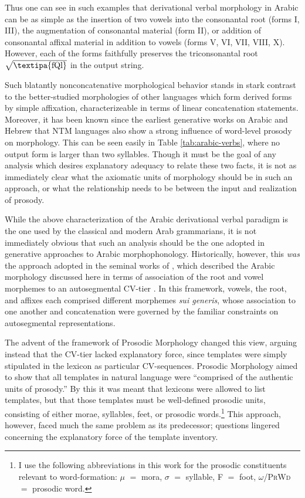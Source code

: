\documentclass[12pt,twoside,letterpaper]{article}
\begin{document}
Thus one can see in such examples that derivational verbal morphology in Arabic can be as simple as the insertion of two vowels into the consonantal root (forms I, III), the augmentation of consonantal material (form II), or addition of consonantal affixal material in addition to vowels (forms V, VI, VII, VIII, X). However, each of the forms faithfully preserves the triconsonantal root $\sqrt{\textrm{\textipa{fQl}}}$ in the output string.

Such blatantly nonconcatenative morphological behavior stands in stark contrast to the better-studied morphologies of other languages which form derived forms by simple affixation, characterizeable in terms of linear concatenation statements. Moreover, it has been known since the earliest generative works on Arabic and Hebrew \citep{mccarthy79,mccarthy81} that NTM languages also show a strong influence of word-level prosody on morphology. This can be seen easily in Table \ref{tab:arabic-verbs}, where no output form is larger than two syllables. Though it must be the goal of any analysis which desires explanatory adequacy to relate these two facts, it is not as immediately clear what the axiomatic units of morphology should be in such an approach, or what the relationship needs to be between the input and realization of prosody.

While the above characterization of the Arabic derivational verbal paradigm is the one used by the classical and modern Arab grammarians, it is not immediately obvious that such an analysis should be the one adopted in generative approaches to Arabic morphophonology. Historically, however, this \emph{was} the approach adopted in the seminal works of \cite{mccarthy79,mccarthy81,mccarthy85}, which described the Arabic morphology discussed here in terms of association of the root and vowel morphemes to an autosegmental CV-tier \citep{goldsmith76}. In this framework, vowels, the root, and affixes each comprised different morphemes \emph{sui generis}, whose association to one another and concatenation were governed by the familiar constraints on autosegmental representations.

The advent of the framework of Prosodic Morphology \citep{mccarthy86} changed this view, arguing instead that the CV-tier lacked explanatory force, since templates were simply stipulated in the lexicon as particular CV-sequences. Prosodic Morphology aimed to show that all templates in natural language were ``comprised of the authentic units of prosody.'' By this it was meant that lexicons were allowed to list templates, but that those templates must be well-defined prosodic units, consisting of either morae, syllables, feet, or prosodic words.\footnote{I use the following abbreviations in this work for the prosodic constituents relevant to word-formation: $\mu$ $=$ mora, $\sigma$ $=$ syllable, F $=$ foot, $\omega$/\textsc{PrWd} $=$ prosodic word.} This approach, however, faced much the same problem as its predecessor; questions lingered concerning the explanatory force of the template inventory.
\end{document}

